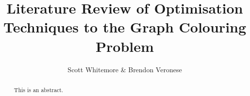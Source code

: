 \documentclass{report}%
\begin{document}
\title{Literature Review of Optimisation Techniques to the Graph Colouring Problem}
\author{Scott Whitemore \& Brendon Veronese}


\maketitle
\begin{abstract}
This is an abstract.
\end{abstract}





\end{document}
